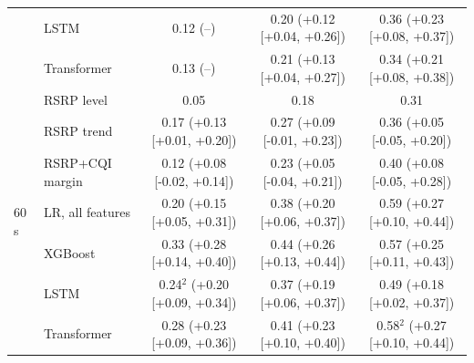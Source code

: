 \documentclass[preprint,review,12pt]{elsarticle}
\begin{document}
\begin{table}[!htbp]
{\begin{tabular}{llccc}
 & LSTM & 0.12 (--) & 0.20 (+0.12 [+0.04, +0.26]) & 0.36 (+0.23 [+0.08, +0.37]) \\
 & Transformer & 0.13 (--) & 0.21 (+0.13 [+0.04, +0.27]) & 0.34 (+0.21 [+0.08, +0.38]) \\
\midrule
\multirow{7}{*}{60\,s} & RSRP level & 0.05 & 0.18 & 0.31 \\
 & RSRP trend & 0.17 (+0.13 [+0.01, +0.20]) & 0.27 (+0.09 [-0.01, +0.23]) & 0.36 (+0.05 [-0.05, +0.20]) \\
 & RSRP+CQI margin & 0.12 (+0.08 [-0.02, +0.14]) & 0.23 (+0.05 [-0.04, +0.21]) & 0.40 (+0.08 [-0.05, +0.28]) \\
 & LR, all features & 0.20 (+0.15 [+0.05, +0.31]) & 0.38 (+0.20 [+0.06, +0.37]) & 0.59 (+0.27 [+0.10, +0.44]) \\
 & XGBoost & 0.33 (+0.28 [+0.14, +0.40]) & 0.44 (+0.26 [+0.13, +0.44]) & 0.57 (+0.25 [+0.11, +0.43]) \\
 & LSTM & 0.24$^{2}$ (+0.20 [+0.09, +0.34]) & 0.37 (+0.19 [+0.06, +0.37]) & 0.49 (+0.18 [+0.02, +0.37]) \\
 & Transformer & 0.28 (+0.23 [+0.09, +0.36]) & 0.41 (+0.23 [+0.10, +0.40]) & 0.58$^{2}$ (+0.27 [+0.10, +0.44]) \\
\bottomrule
\end{tabular}}
\end{table}
\end{document}
